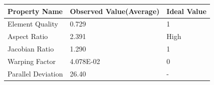 \documentclass[../../main.tex]{subfiles}
\begin{document}
\begin{enumerate}
\begin{enumerate}
\begin{enumerate}
\begin{table}[H]
                \centering
                \begin{tabular}{|p{3.5cm}|p{3.5cm}|p{3cm}|}
                    \hline
                    \textbf{Property Name} & \textbf{Observed Value(Average)} & \textbf{Ideal Value} \\
                    \hline
                  Element Quality & 0.729 & 1 \\
                  \hline
                  Aspect Ratio & 2.391 & High \\
                  \hline
                  Jacobian Ratio & 1.290 & 1 \\
                  \hline
                  Warping Factor & 4.078E-02 & 0 \\
                  \hline
                Parallel Deviation & 26.40 & - \\


\end{tabular}
\end{table}
\end{enumerate}
\end{enumerate}
\end{enumerate}
\end{document}
